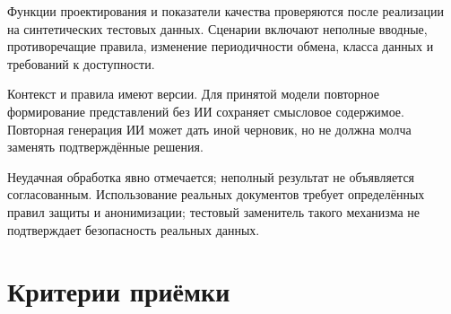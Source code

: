\documentclass[10pt,a4paper]{article}
\begin{document}
Функции проектирования и показатели качества проверяются после реализации на синтетических тестовых данных. Сценарии включают неполные вводные, противоречащие правила, изменение периодичности обмена, класса данных и требований к доступности.

Контекст и правила имеют версии. Для принятой модели повторное формирование представлений без ИИ сохраняет смысловое содержимое. Повторная генерация ИИ может дать иной черновик, но не должна молча заменять подтверждённые решения.

Неудачная обработка явно отмечается; неполный результат не объявляется согласованным. Использование реальных документов требует определённых правил защиты и анонимизации; тестовый заменитель такого механизма не подтверждает безопасность реальных данных.

\section{Критерии приёмки}\label{ux43aux440ux438ux442ux435ux440ux438ux438-ux43fux440ux438ux451ux43cux43aux438}
\end{document}
